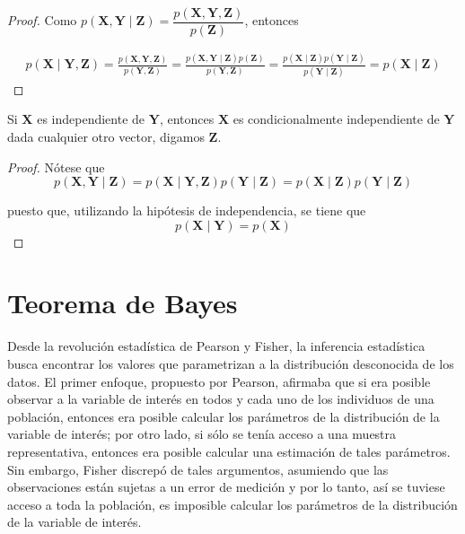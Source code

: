 \documentclass[10pt,openright]{book}\usepackage[]{graphicx}\usepackage[]{color}
\begin{document}
\begin{proof}
Como $p(\mathbf{X},\mathbf{Y} \mid \mathbf{Z})=\dfrac{p(\mathbf{X},\mathbf{Y},\mathbf{Z})}{p(\mathbf{Z})}$, entonces

\begin{align*}
p(\mathbf{X} \mid \mathbf{Y},\mathbf{Z})=\frac{p(\mathbf{X},\mathbf{Y},\mathbf{Z})}{p(\mathbf{Y},\mathbf{Z})}
=\frac{p(\mathbf{X},\mathbf{Y} \mid \mathbf{Z})p(\mathbf{Z})}{p(\mathbf{Y},\mathbf{Z})}
=\frac{p(\mathbf{X} \mid \mathbf{Z})p(\mathbf{Y} \mid \mathbf{Z})}{p(\mathbf{Y} \mid \mathbf{Z})}=p(\mathbf{X} \mid \mathbf{Z})
\end{align*}
\end{proof}

\begin{Res}
Si $\mathbf{X}$ es independiente de $\mathbf{Y}$, entonces $\mathbf{X}$ es condicionalmente independiente de $\mathbf{Y}$ dada cualquier otro vector, digamos $\mathbf{Z}$.
\end{Res}

\begin{proof}
Nótese que
\begin{equation*}
p(\mathbf{X},\mathbf{Y}\mid \mathbf{Z})=p(\mathbf{X} \mid \mathbf{Y},\mathbf{Z})p(\mathbf{Y} \mid \mathbf{Z})=p(\mathbf{X} \mid \mathbf{Z})p(\mathbf{Y} \mid \mathbf{Z})
\end{equation*}

puesto que, utilizando la hipótesis de independencia, se tiene que
\begin{equation*}
p(\mathbf{X} \mid \mathbf{Y})=p(\mathbf{X})
\end{equation*}
\end{proof}

\section{Teorema de Bayes}

Desde la revolución estadística de Pearson y Fisher, la inferencia estadística busca encontrar los valores que parametrizan a la distribución desconocida de los datos. El primer enfoque, propuesto por Pearson, afirmaba que si era posible observar a la variable de interés en todos y cada uno de los individuos de una población, entonces era posible calcular los parámetros de la distribución de la variable de interés; por otro lado, si sólo se tenía acceso a una muestra representativa, entonces era posible calcular una estimación de tales parámetros. Sin embargo, Fisher discrepó de tales argumentos, asumiendo que las observaciones están sujetas a un error de medición y por lo tanto, así se tuviese acceso a toda la población, es imposible calcular los parámetros de la distribución de la variable de interés.
\end{document}
